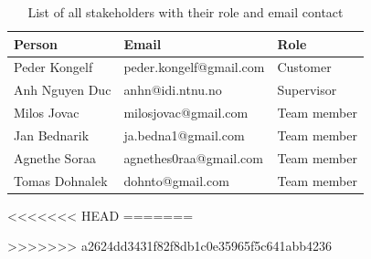 \begin{table}[!ht]\centering
\caption{List of all stakeholders with their role and email contact}
\label{tab:stakeholders_summary}
\def\arraystretch{1.3}
\begin{tabular}{lll}
\toprule[0.5mm]
\textbf{Person} & \textbf{Email} & \textbf{Role}\\
\midrule
Peder Kongelf & peder.kongelf@gmail.com  & Customer\\
\midrule
Anh Nguyen Duc	 & anhn@idi.ntnu.no & Supervisor \\
\midrule
Milos Jovac &  milosjovac@gmail.com & Team member  \\
Jan Bednarik &  ja.bedna1@gmail.com & Team member\\
Agnethe Soraa & agnethes0raa@gmail.com & Team member  \\
Tomas Dohnalek & dohnto@gmail.com & Team member \\
\bottomrule[0.5mm]
\end{tabular}
\end{table}

<<<<<<< HEAD
=======

>>>>>>> a2624dd3431f82f8db1c0e35965f5c641abb4236
